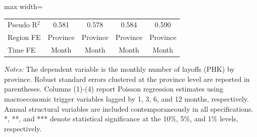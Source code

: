 \begin{table}[H]
\begin{adjustbox}{max width=\textwidth}
\begin{tabular}{l*{4}{c}}
Pseudo R$^2$&       0.581         &       0.578         &       0.584         &       0.590         \\
Region FE   &    Province         &    Province         &    Province         &    Province         \\
Time FE     &       Month         &       Month         &       Month         &       Month         \\
\bottomrule
\end{tabular}
\end{adjustbox}
\begin{tablenotes}
\footnotesize
\item \textit{Notes:} The dependent variable is the monthly number of layoffs (PHK) by province. Robust standard errors clustered at the province level are reported in parentheses. Columns (1)-(4) report Poisson regression estimates using macroeconomic trigger variables lagged by 1, 3, 6, and 12 months, respectively. Annual structural variables are included contemporaneously in all specifications. *, **, and *** denote statistical significance at the 10\%, 5\%, and 1\% levels, respectively.
\end{tablenotes}
\end{table}
